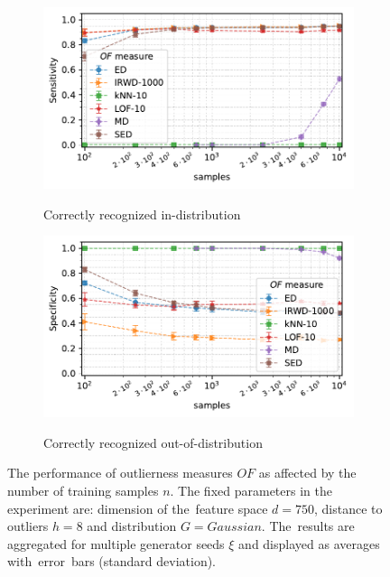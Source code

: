 \begin{figure}[t]
\begin{subfigure}[b]{0.495\textwidth}
        \centering
        \caption{\small Correctly recognized in-distribution}
        \includegraphics[width=\textwidth]{images/distributions/trends-n/trend-distributions-sens_95(samples)-dimension_750-distance_8-distribution_gaussian-model_ED,IRWD-1000,kNN-10,LOF-10,MD,SED-aggregated.pdf}
        \label{fig:samples-sensitivity}
    \end{subfigure}
    \hfill
    \begin{subfigure}[b]{0.495\textwidth}
        \centering
        \caption{\small Correctly recognized out-of-distribution}
        \includegraphics[width=\textwidth]{images/distributions/trends-n/trend-distributions-spec_95(samples)-dimension_750-distance_8-distribution_gaussian-model_ED,IRWD-1000,kNN-10,LOF-10,MD,SED-aggregated.pdf}
        \label{fig:samples-specificity}
    \end{subfigure}
    \caption{The performance of outlierness measures $OF$ as affected by the number of training samples $n$. The fixed parameters in the experiment are: dimension of the~feature space $d = 750$, distance to outliers $h = 8$ and distribution $G = Gaussian$. The~results are aggregated for multiple generator seeds $\xi$ and displayed as averages with~error~bars (standard deviation).}
    \label{fig:samples}
    \vspace{-1.0em}
\end{figure}


